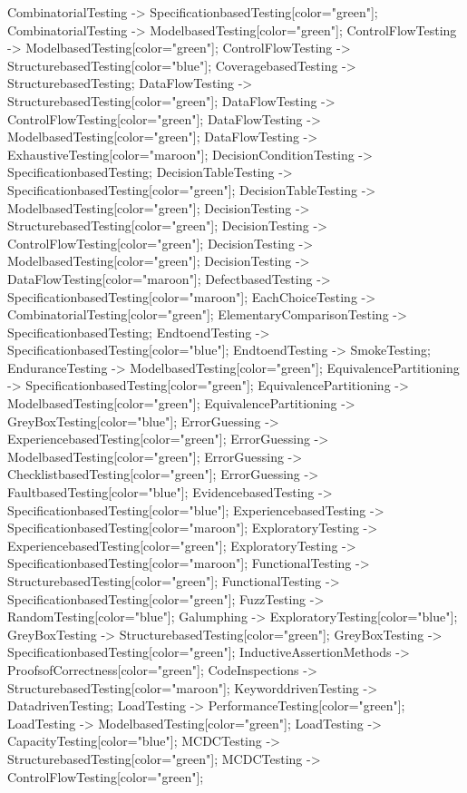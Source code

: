 \documentclass{article}
\begin{document}
{CombinatorialTesting -> SpecificationbasedTesting[color="green"];
CombinatorialTesting -> ModelbasedTesting[color="green"];
ControlFlowTesting -> ModelbasedTesting[color="green"];
ControlFlowTesting -> StructurebasedTesting[color="blue"];
CoveragebasedTesting -> StructurebasedTesting;
DataFlowTesting -> StructurebasedTesting[color="green"];
DataFlowTesting -> ControlFlowTesting[color="green"];
DataFlowTesting -> ModelbasedTesting[color="green"];
DataFlowTesting -> ExhaustiveTesting[color="maroon"];
DecisionConditionTesting -> SpecificationbasedTesting;
DecisionTableTesting -> SpecificationbasedTesting[color="green"];
DecisionTableTesting -> ModelbasedTesting[color="green"];
DecisionTesting -> StructurebasedTesting[color="green"];
DecisionTesting -> ControlFlowTesting[color="green"];
DecisionTesting -> ModelbasedTesting[color="green"];
DecisionTesting -> DataFlowTesting[color="maroon"];
DefectbasedTesting -> SpecificationbasedTesting[color="maroon"];
EachChoiceTesting -> CombinatorialTesting[color="green"];
ElementaryComparisonTesting -> SpecificationbasedTesting;
EndtoendTesting -> SpecificationbasedTesting[color="blue"];
EndtoendTesting -> SmokeTesting;
EnduranceTesting -> ModelbasedTesting[color="green"];
EquivalencePartitioning -> SpecificationbasedTesting[color="green"];
EquivalencePartitioning -> ModelbasedTesting[color="green"];
EquivalencePartitioning -> GreyBoxTesting[color="blue"];
ErrorGuessing -> ExperiencebasedTesting[color="green"];
ErrorGuessing -> ModelbasedTesting[color="green"];
ErrorGuessing -> ChecklistbasedTesting[color="green"];
ErrorGuessing -> FaultbasedTesting[color="blue"];
EvidencebasedTesting -> SpecificationbasedTesting[color="blue"];
ExperiencebasedTesting -> SpecificationbasedTesting[color="maroon"];
ExploratoryTesting -> ExperiencebasedTesting[color="green"];
ExploratoryTesting -> SpecificationbasedTesting[color="maroon"];
FunctionalTesting -> StructurebasedTesting[color="green"];
FunctionalTesting -> SpecificationbasedTesting[color="green"];
FuzzTesting -> RandomTesting[color="blue"];
Galumphing -> ExploratoryTesting[color="blue"];
GreyBoxTesting -> StructurebasedTesting[color="green"];
GreyBoxTesting -> SpecificationbasedTesting[color="green"];
InductiveAssertionMethods -> ProofsofCorrectness[color="green"];
CodeInspections -> StructurebasedTesting[color="maroon"];
KeyworddrivenTesting -> DatadrivenTesting;
LoadTesting -> PerformanceTesting[color="green"];
LoadTesting -> ModelbasedTesting[color="green"];
LoadTesting -> CapacityTesting[color="blue"];
MCDCTesting -> StructurebasedTesting[color="green"];
MCDCTesting -> ControlFlowTesting[color="green"];
}
\end{document}
